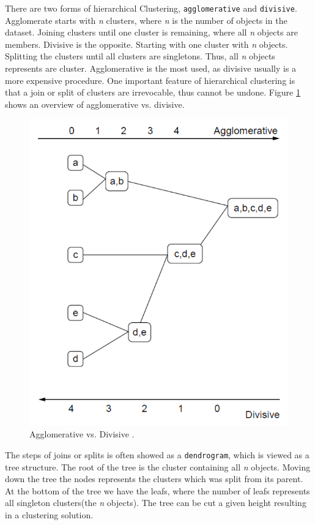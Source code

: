 \documentclass[a4paper,10pt]{article}
\theoremstyle{plain}
\theoremstyle{definition}
\begin{document}
There are two forms of hierarchical Clustering, \texttt{agglomerative} and \texttt{divisive}. Agglomerate starts with \textit{n} clusters, where \textit{n} is the number of objects in the dataset. Joining clusters until one cluster is remaining, where all \textit{n} objects are members. Divisive is the opposite. Starting with one cluster with \textit{n} objects. Splitting the clusters until all clusters are singletons. Thus, all \textit{n} objects represents are cluster. Agglomerative is the most used, as divisive usually is a more expensive procedure. One important feature of hierarchical clustering is that a join or split of clusters are irrevocable, thus cannot be undone. Figure \ref{fig:agglo_vs_div} shows an overview of agglomerative vs. divisive.
\begin{figure}[H]
	\centering
	\includegraphics*[scale=0.3]{./pictures/hc/agglo_vs_div.png}
	\caption{Agglomerative vs. Divisive \cite{clusterAnalysis}.}
	\label{fig:agglo_vs_div}
\end{figure} 
The steps of joins or splits is often showed as a \texttt{dendrogram}, which is viewed as a tree structure. The root of the tree is the cluster containing all \textit{n} objects. Moving down the tree the nodes represents the clusters which was split from its parent. At the bottom of the tree we have the leafs, where the number of leafs represents all singleton clusters(the \textit{n} objects). The tree can be cut a given height resulting in a clustering solution. 
\end{document}

